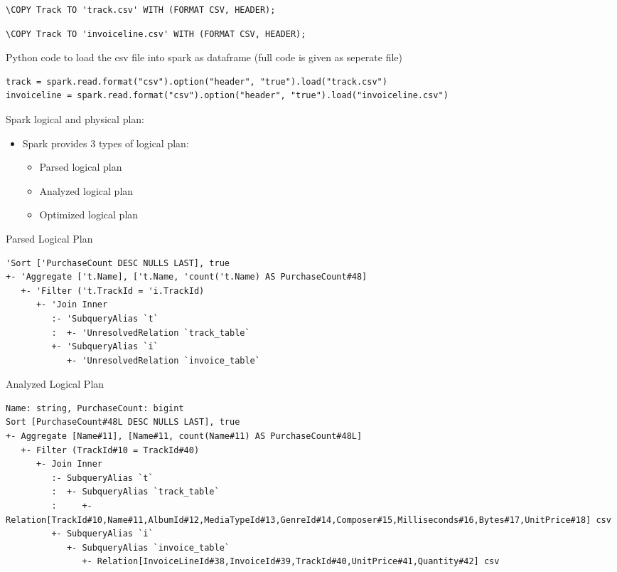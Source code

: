 \begin{exercise}{9}
  
  \begin{subexercise}
    \begin{lstlisting}[breaklines=true]
      \COPY Track TO 'track.csv' WITH (FORMAT CSV, HEADER);
    \end{lstlisting}
    \begin{lstlisting}[breaklines=true]
      \COPY Track TO 'invoiceline.csv' WITH (FORMAT CSV, HEADER);
    \end{lstlisting}

    Python code to load the csv file into spark as dataframe (full code is given
    as seperate file)
    \begin{lstlisting}[breaklines=true]
    track = spark.read.format("csv").option("header", "true").load("track.csv")
invoiceline = spark.read.format("csv").option("header", "true").load("invoiceline.csv")
    \end{lstlisting}
  \end{subexercise}

  \begin{subexercise}
    Spark logical and physical plan:
    \begin{itemize}
      \item Spark provides 3 types of logical plan:
        \begin{itemize}
          \item Parsed logical plan
          \item Analyzed logical plan
          \item Optimized logical plan
        \end{itemize}
    \end{itemize}

    Parsed Logical Plan
    \begin{lstlisting}[breaklines=true]
'Sort ['PurchaseCount DESC NULLS LAST], true
+- 'Aggregate ['t.Name], ['t.Name, 'count('t.Name) AS PurchaseCount#48]
   +- 'Filter ('t.TrackId = 'i.TrackId)
      +- 'Join Inner
         :- 'SubqueryAlias `t`
         :  +- 'UnresolvedRelation `track_table`
         +- 'SubqueryAlias `i`
            +- 'UnresolvedRelation `invoice_table`
    \end{lstlisting}
    Analyzed Logical Plan
    \begin{lstlisting}[breaklines=true]
Name: string, PurchaseCount: bigint
Sort [PurchaseCount#48L DESC NULLS LAST], true
+- Aggregate [Name#11], [Name#11, count(Name#11) AS PurchaseCount#48L]
   +- Filter (TrackId#10 = TrackId#40)
      +- Join Inner
         :- SubqueryAlias `t`
         :  +- SubqueryAlias `track_table`
         :     +- Relation[TrackId#10,Name#11,AlbumId#12,MediaTypeId#13,GenreId#14,Composer#15,Milliseconds#16,Bytes#17,UnitPrice#18] csv
         +- SubqueryAlias `i`
            +- SubqueryAlias `invoice_table`
               +- Relation[InvoiceLineId#38,InvoiceId#39,TrackId#40,UnitPrice#41,Quantity#42] csv
    \end{lstlisting}


\end{subexercise}
\end{exercise}
